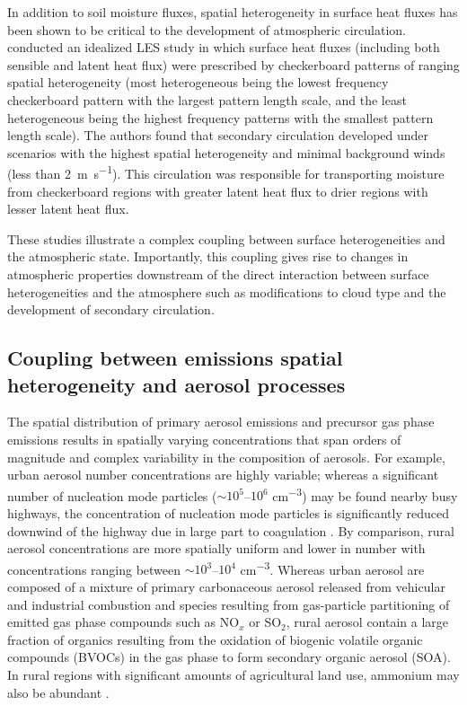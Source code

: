 In addition to soil moisture fluxes, spatial heterogeneity in surface heat fluxes has been shown to be critical to the development of atmospheric circulation. \textcite{lee_effect_2019} conducted an idealized LES study in which surface heat fluxes (including both sensible and latent heat flux) were prescribed by checkerboard patterns of ranging spatial heterogeneity (most heterogeneous being the lowest frequency checkerboard pattern with the largest pattern length scale, and the least heterogeneous being the highest frequency patterns with the smallest pattern length scale). The authors found that secondary circulation developed under scenarios with the highest spatial heterogeneity and minimal background winds (less than 2~\si{m.s^{-1}}). This circulation was responsible for transporting moisture from checkerboard regions with greater latent heat flux to drier regions with lesser latent heat flux. 

These studies illustrate a complex coupling between surface heterogeneities and the atmospheric state. Importantly, this coupling gives rise to changes in atmospheric properties downstream of the direct interaction between surface heterogeneities and the atmosphere such as modifications to cloud type and the development of secondary circulation.   

\subsection{Coupling between emissions spatial heterogeneity and aerosol processes}

The spatial distribution of primary aerosol emissions and precursor gas phase emissions results in spatially varying concentrations that span orders of magnitude and complex variability in the composition of aerosols. For example, urban aerosol number concentrations are highly variable; whereas a significant number of nucleation mode particles ($\sim10^5$--$10^6$ \si{cm^{-3}}) may be found nearby busy highways, the concentration of nucleation mode particles is significantly reduced downwind of the highway due in large part to coagulation \parencite{zhu_study_2002}. By comparison, rural aerosol concentrations are more spatially uniform and lower in number with concentrations ranging between $\sim10^3$--$10^4$ \si{cm^{-3}}. Whereas urban aerosol are composed of a mixture of primary carbonaceous aerosol released from vehicular and industrial combustion and species resulting from gas-particle partitioning of emitted gas phase compounds such as NO$_x$ or SO$_2$, rural aerosol contain a large fraction of organics resulting from the oxidation of biogenic volatile organic compounds (BVOCs) in the gas phase to form secondary organic aerosol (SOA). In rural regions with significant amounts of agricultural land use, ammonium may also be abundant \parencite{seinfeld_atmospheric_1998}. 

